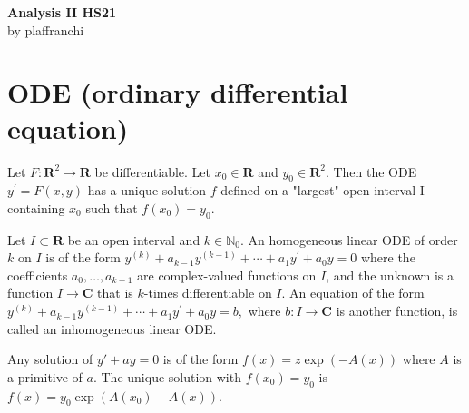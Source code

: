 \documentclass[10pt,landscape, a4paper]{article}
\newcommand{\custombox}[3]{\begin{tcolorbox}[title = \textbf{#1}, colback=#2!10!white, colframe = #2!70!white, coltitle=white]
    #3
    \end{tcolorbox}}
\newcommand{\theorem}[2]{\custombox{Theorem #1}{red}{#2}}
\newcommand{\definition}[2]{\custombox{Definition #1}{orange}{#2}}
\newcommand{\prop}[2]{\custombox{Proposition #1}{yellow!60!orange}{#2}}
\begin{document}
\begin{multicols*}{3}
    \begin{center}
        \Large{\textbf{Analysis II HS21}} \\
        \small{by plaffranchi}
    \end{center}
    \section{ODE (ordinary differential equation)}
    \theorem{2.1.6}{Let $F: \mathbf{R}^{2} \rightarrow \mathbf{R}$ be differentiable. Let $x_{0} \in \mathbf{R}$ and $y_{0} \in \mathbf{R}^{2}$. Then the ODE
    $ y^{\prime}=F(x, y) $ has a unique solution $f$ defined on a "largest" open interval I containing $x_{0}$ such that $f\left(x_{0}\right)=y_{0} .$}
    \definition{2.2.1}{Let $I \subset \mathbf{R}$ be an open interval and $k \in \mathbb{N}_0$. An homogeneous linear ODE of order $k$ on $I$ is of the form
    $
        y^{(k)}+a_{k-1} y^{(k-1)}+\cdots+a_{1} y^{\prime}+a_{0} y=0
    $
    where the coefficients $a_{0}, \ldots, a_{k-1}$ are complex-valued functions on $I$, and the unknown is a function $I \to \mathbf{C}$ that is $k$-times differentiable on $I$.
    An equation of the form
    $
        y^{(k)}+a_{k-1} y^{(k-1)}+\cdots+a_{1} y^{\prime}+a_{0} y=b,
    $
    where $b: I \rightarrow \mathbf{C}$ is another function, is called an inhomogeneous linear ODE.}



    \prop{2.3.1}{Any solution of $y'+ay=0$ is of the form $f(x)=z\exp(-A(x))$ where $A$ is a primitive of $a$. The unique solution with $f(x_0)=y_0$ is $f(x)= y_0\exp(A(x_0)-A(x))$.}
\end{multicols*}
\end{document}
